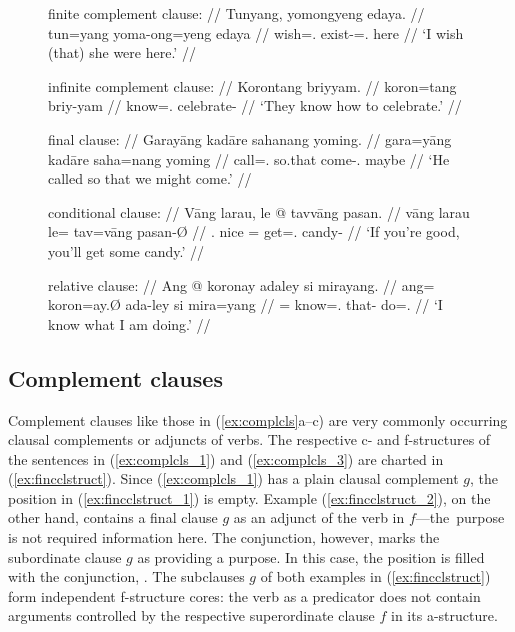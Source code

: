 \begin{figure}
\pex\label{ex:complcls}
\a\label{ex:complcls_1}\begingl
	\glpreamble finite complement clause: //
	\gla Tunyang, yomongyeng edaya. //
	\glb tun=yang yoma-ong=yeng edaya //
	\glc wish=\Fsg{}.\Aarg{} exist-\Irr{}=\Fsg{}.\Aarg{} here //
	\glft `I wish (that) she were here.' //
\endgl

\a\label{ex:complcls_2}\begingl
	\glpreamble infinite complement clause: //
	\gla Korontang briyyam. //
	\glb koron=tang briy-yam //
	\glc know=\TplM{}.\Aarg{} celebrate-\Ptcp{} //
	\glft `They know how to celebrate.' //
\endgl

\a\label{ex:complcls_3}\begingl
	\glpreamble final clause: //
	\gla Garayāng kadāre sahanang yoming. //
	\glb gara=yāng kadāre saha=nang yoming //
	\glc call=\TsgM{}.\Aarg{} so.that come-\Fpl{}.\Aarg{} maybe //
	\glft `He called so that we might come.' //
\endgl

\a\label{ex:complcls_4}\begingl
	\glpreamble conditional clause: //
	\gla Vāng larau, le @ tavvāng pasan. //
	\glb vāng larau le= tav=vāng pasan-Ø //
	\glc \Second{}.\Aarg{} nice \PatT{}= get=\Second{}.\Aarg{} candy-\Top{} //
	\glft `If you're good, you'll get some candy.' //
\endgl

\a\label{ex:complcls_5}\begingl
	\glpreamble relative clause: //
	\gla Ang @ koronay adaley si mirayang. //
	\glb ang= koron=ay.Ø ada-ley si mira=yang //
	\glc \AgtT{}= know=\Fsg{}.\Top{} that-\PargI{} \Rel{} do=\Fsg{}.\Aarg{} //
	\glft `I know what I am doing.' //
\endgl

\xe
\end{figure}

\subsection{Complement clauses}
\label{subsec:complcs}

Complement clauses like those in (\ref{ex:complcls}a--c) are very commonly
occurring clausal complements or adjuncts of verbs. The respective c- and
f-structures of the sentences in (\ref{ex:complcls_1}) and
(\ref{ex:complcls_3}) are charted in (\ref{ex:fincclstruct}). Since
(\ref{ex:complcls_1}) has a plain clausal complement $g$, the 
position in (\ref{ex:fincclstruct_1}) is empty. Example
(\ref{ex:fincclstruct_2}), on the other hand, contains a final clause $g$ as an
adjunct of the verb in $f$---the purpose is not required information here. The
conjunction, however, marks the subordinate clause $g$ as providing a purpose.
In this case, the  position is filled with the conjunction, 
. The subclauses $g$ of both examples in
(\ref{ex:fincclstruct}) form independent f-structure cores: the verb as a
predicator does not contain arguments controlled by the respective
superordinate clause $f$ in its a-structure.

